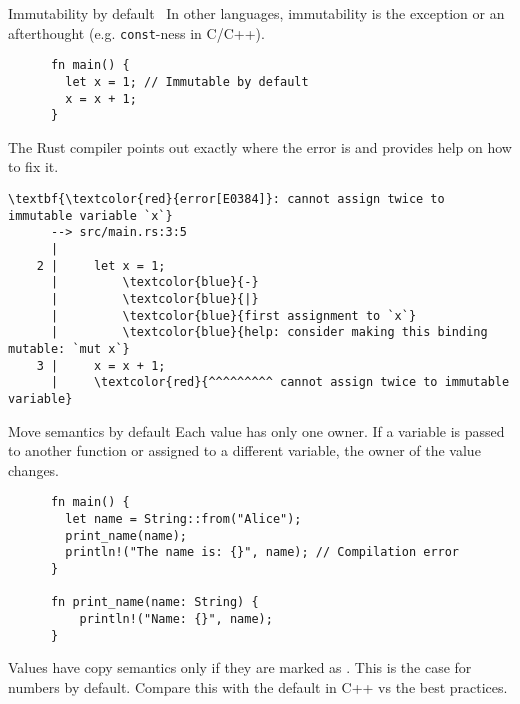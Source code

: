 \documentclass{beamer}
\begin{document}
\begin{frame}[fragile]{Immutability by default}\
  \scriptsize
  In other languages, immutability is the exception or an afterthought (e.g. \texttt{const}-ness in C/C++).

  \begin{listing}
    \begin{verbatim}
      fn main() {
        let x = 1; // Immutable by default
        x = x + 1;
      }
    \end{verbatim}
  \end{listing}

  \vfill
  The Rust compiler points out exactly where the error is and provides help on how to fix it.

  \begin{listing}
    \scriptsize
    \begin{Verbatim}[commandchars=\\\{\}]
      \textbf{\textcolor{red}{error[E0384]}: cannot assign twice to immutable variable `x`}
      --> src/main.rs:3:5
      |
    2 |     let x = 1;
      |         \textcolor{blue}{-}
      |         \textcolor{blue}{|}
      |         \textcolor{blue}{first assignment to `x`}
      |         \textcolor{blue}{help: consider making this binding mutable: `mut x`}
    3 |     x = x + 1;
      |     \textcolor{red}{^^^^^^^^^ cannot assign twice to immutable variable}
    \end{Verbatim}
  \end{listing}
\end{frame}

\begin{frame}[fragile]{Move semantics by default}
  Each value has only one owner.
  If a variable is passed to another function or assigned to a different variable, the owner of the value changes.

  \vfill

  \begin{listing}
    \begin{verbatim}
      fn main() {
        let name = String::from("Alice");
        print_name(name);
        println!("The name is: {}", name); // Compilation error
      }
    
      fn print_name(name: String) {
          println!("Name: {}", name);
      }
    \end{verbatim}
  \end{listing}

  \vfill

  Values have copy semantics only if they are marked as .
  This is the case for numbers by default. Compare this with the default in C++ vs the best practices.
\end{frame}
\end{document}
